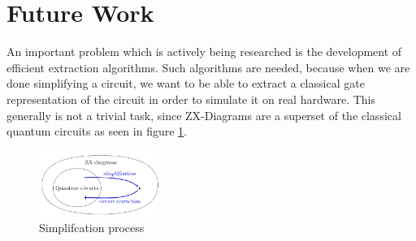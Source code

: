 \section{Future Work}

An important problem which is actively being researched is the development of efficient extraction algorithms. Such algorithms are needed, because when we are done simplifying a circuit, we want to be able to extract a classical gate representation of the circuit in order to simulate it on real hardware. This generally is not a trivial task, since ZX-Diagrams are a superset of the classical quantum circuits\cite{duncan2020simplification} as seen in figure \ref{fig:extraction}.

\begin{figure}[h]
    \centering
    \includegraphics[width=0.35\textwidth]{images/extraction.png}
    \caption{Simplifcation process\cite{duncan2020simplification}}
    \label{fig:extraction}
\end{figure}